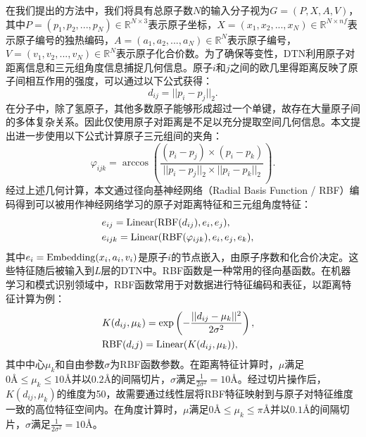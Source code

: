 
在我们提出的方法中，我们将具有总原子数$N$的输入分子视为$G = (P, X, A, V)$，其中$P = (p_1, p_2, ..., p_N) \in \mathbb{R}^{N \times 3}$表示原子坐标，$X = (x_1, x_2, ..., x_N) \in \mathbb{R}^{N \times nf}$表示原子编号的独热编码，$A = (a_1, a_2, ..., a_N) \in \mathbb{R}^{N}$表示原子编号，$V = (v_1, v_2, ..., v_N) \in \mathbb{R}^{N}$表示原子化合价数。为了确保等变性，DTN利用原子对距离信息和三元组角度信息捕捉几何信息。原子$i$和$j$之间的欧几里得距离反映了原子间相互作用的强度，可以通过以下公式获得：
\begin{equation}
    d_{ij} = ||p_i - p_j||_2.
\end{equation}
在分子中，除了氢原子，其他多数原子能够形成超过一个单键，故存在大量原子间的多体复杂关系。因此仅使用原子对距离是不足以充分提取空间几何信息。本文提出进一步使用以下公式计算原子三元组间的夹角：
\begin{equation}
    \varphi_{ijk} = \arccos \left(\frac{(p_i - p_j) \times (p_i - p_k)}{||p_i - p_j||_2 \times ||p_i - p_k||_2} \right). 
\end{equation}
经过上述几何计算，本文通过径向基神经网络（Radial Basis Function / RBF）编码得到可以被用作神经网络学习的原子对距离特征和三元组角度特征：
\begin{eqnarray}
    &e_{ij} = {\rm Linear}({\rm RBF}(d_{ij}), e_i, e_j),& \\
    &e_{ijk} = {\rm Linear}({\rm RBF}(\varphi_{ijk}), e_i, e_j, e_k),&
\end{eqnarray}
其中$e_i = {\rm Embedding}(x_i, a_i, v_i)$是原子$i$的节点嵌入，由原子序数和化合价决定。这些特征随后被输入到$L$层的DTN中。RBF函数是一种常用的径向基函数。在机器学习和模式识别领域中，RBF函数常用于对数据进行特征编码和表征，以距离特征计算为例：
\begin{eqnarray}
    &K(d_{ij}, \mu_k) = {\rm exp} \left(- \frac{||d_{ij} - \mu_k||^2}{2\sigma^2}\right), & \\
    &{\rm RBF}(d_ij) = {\rm Linear}(K(d_{ij}, \mu_k)), &
\end{eqnarray}
其中中心$\mu_k$和自由参数$\sigma$为RBF函数参数。在距离特征计算时，$\mu$满足$0 \text{\AA} \leq \mu_k \leq 10 \text{\AA}$并以$0.2\text{\AA}$的间隔切片，$\sigma$满足$\frac{1}{2\sigma^2} = 10 \text{\AA}$。经过切片操作后，$K(d_{ij}, \mu_k)$的维度为50，故需要通过线性层将RBF特征映射到与原子对特征维度一致的高位特征空间内。在角度计算时，$\mu$满足$0 \text{\AA} \leq \mu_k \leq \pi \text{\AA}$并以$0.1\text{\AA}$的间隔切片，$\sigma$满足$\frac{1}{2\sigma^2} = 10 \text{\AA}$。

